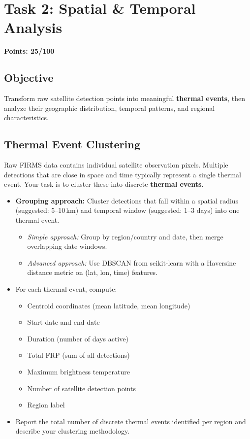 \documentclass[11pt]{article}
\begin{document}
\section{Task 2: Spatial \& Temporal Analysis}
\noindent\textbf{Points: 25/100}

\subsection{Objective}
Transform raw satellite detection points into meaningful \textbf{thermal events}, then analyze their geographic distribution, temporal patterns, and regional characteristics.

\subsection{Thermal Event Clustering}
Raw FIRMS data contains individual satellite observation pixels. Multiple detections that are close in space and time typically represent a single thermal event. Your task is to cluster these into discrete \textbf{thermal events}.
\begin{itemize}
  \item \textbf{Grouping approach:} Cluster detections that fall within a spatial radius (suggested: 5--10\,km) and temporal window (suggested: 1--3 days) into one thermal event.
  \begin{itemize}
    \item \emph{Simple approach:} Group by region/country and date, then merge overlapping date windows.
    \item \emph{Advanced approach:} Use DBSCAN from scikit-learn with a Haversine distance metric on (lat, lon, time) features.
  \end{itemize}
  \item For each thermal event, compute:
  \begin{itemize}
    \item Centroid coordinates (mean latitude, mean longitude)
    \item Start date and end date
    \item Duration (number of days active)
    \item Total FRP (sum of all detections)
    \item Maximum brightness temperature
    \item Number of satellite detection points
    \item Region label
  \end{itemize}
  \item Report the total number of discrete thermal events identified per region and describe your clustering methodology.
\end{itemize}
\end{document}
